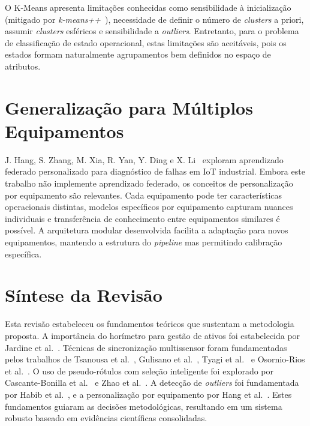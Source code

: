O K-Means apresenta limitações conhecidas como sensibilidade à inicialização (mitigado por \textit{k-means++}~\cite{arthur2007k}), necessidade de definir o número de \textit{clusters} a priori, assumir \textit{clusters} esféricos e sensibilidade a \textit{outliers}. Entretanto, para o problema de classificação de estado operacional, estas limitações são aceitáveis, pois os estados formam naturalmente agrupamentos bem definidos no espaço de atributos.

\section{Generalização para Múltiplos Equipamentos}

J. Hang, S. Zhang, M. Xia, R. Yan, Y. Ding e X. Li~\cite{hang2022personalized} exploram aprendizado federado personalizado para diagnóstico de falhas em IoT industrial. Embora este trabalho não implemente aprendizado federado, os conceitos de personalização por equipamento são relevantes. Cada equipamento pode ter características operacionais distintas, modelos específicos por equipamento capturam nuances individuais e transferência de conhecimento entre equipamentos similares é possível. A arquitetura modular desenvolvida facilita a adaptação para novos equipamentos, mantendo a estrutura do \textit{pipeline} mas permitindo calibração específica.

\section{Síntese da Revisão}

Esta revisão estabeleceu os fundamentos teóricos que sustentam a metodologia proposta. A importância do horímetro para gestão de ativos foi estabelecida por Jardine et al.~\cite{jardine2006review}. Técnicas de sincronização multissensor foram fundamentadas pelos trabalhos de Tsanousa et al.~\cite{tsanousa2022review}, Gulisano et al.~\cite{gulisano2020ananke}, Tyagi et al.~\cite{tyagi2024comprehensive} e Osornio-Rios et al.~\cite{osornio2023data}. O uso de pseudo-rótulos com seleção inteligente foi explorado por Cascante-Bonilla et al.~\cite{cascante2021revisiting} e Zhao et al.~\cite{zhao2023hybrid}. A detecção de \textit{outliers} foi fundamentada por Habib et al.~\cite{habib2015outliers}, e a personalização por equipamento por Hang et al.~\cite{hang2022personalized}. Estes fundamentos guiaram as decisões metodológicas, resultando em um sistema robusto baseado em evidências científicas consolidadas.
